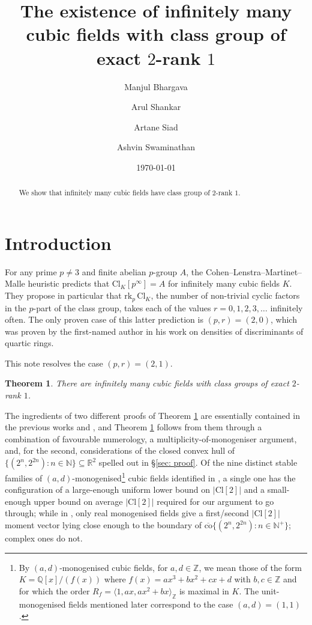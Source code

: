 \documentclass[a4paper, 12pt]{amsart}
\author{Manjul Bhargava}
\author{Arul Shankar}
\author{Artane Siad}
\author{Ashvin Swaminathan}
\date{\today}
\title[Cubic fields with class group of exact $2$-rank $1$]{The existence of infinitely many cubic fields with class group of exact $2$-rank $1$}
\newcommand{\rk}{\mathrm{rk}}
\newtheorem{theorem}{Theorem}
\newcommand{\Cl}{\mathrm{Cl}}
\begin{document}
\maketitle

\begin{abstract}
We show that infinitely many cubic fields have class group of $2$-rank $1$.
\end{abstract}

\section{Introduction}


For any prime $p \neq 3$ and finite abelian $p$-group $A$, the Cohen--Lenstra--Martinet--Malle heuristic predicts that $\Cl_K[p^\infty] = A$ for infinitely many cubic fields $K$.
They propose in particular that $\rk_p \, \Cl_K$, the number of non-trivial cyclic factors in the $p$-part of the class group, takes each of the values $r = 0,1,2,3,\ldots$ infinitely often. 
The only proven case of this latter prediction is $(p,r) = (2,0)$, which was proven by the first-named author in his work \cite[Theorem 5]{MR2183288} on densities of discriminants of quartic rings.

This note resolves the case $(p,r) = (2,1)$.

\begin{theorem} \label{thm: main theorem}
    There are infinitely many cubic fields with class groups of exact $2$-rank $1$.
\end{theorem}

The ingredients of two different proofs of Theorem \ref{thm: main theorem} are essentially contained in the previous works \cite{MR4891959} and \cite{2506.05539}, and Theorem \ref{thm: main theorem} follows from them through a combination of favourable numerology, a multiplicity-of-monogeniser argument, and, for the second, considerations of the closed convex hull of $\{(2^n,2^{2n}) \colon n \in \mathbb{N}\} \subseteq \mathbb{R}^2$ spelled out in \S \ref{sec: proof}. Of the nine distinct stable families of $(a,d)$-monogenised\footnote{By $(a,d)$-monogenised cubic fields, for $a,d \in \mathbb{Z}$, we mean those of the form $K = \mathbb{Q}[x]/(f(x))$ where $f(x) = ax^3 + bx^2 + cx + d$ with $b,c \in \mathbb{Z}$ and for which the order $R_f = \langle 1, ax, ax^2+bx \rangle_\mathbb{Z}$ is maximal in $K$. The unit-monogenised fields mentioned later correspond to the case $(a,d) = (1,1)$.} cubic fields identified in \cite{MR4891959}, a single one has the configuration of a large-enough uniform lower bound on $\lvert \Cl[2] \rvert$ and a small-enough upper bound on average $\lvert \Cl[2] \rvert$ required for our argument to go through; while in \cite{2506.05539}, only real monogenised fields give a first/second $\lvert \Cl[2] \rvert$ moment vector lying close enough to the boundary of $\overline{\mathrm{co}}\{(2^n,2^{2n}) \colon n \in \mathbb{N}^+\}$; complex ones do not. 
\end{document}
